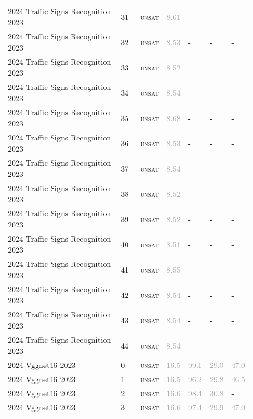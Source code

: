 \begin{center}
{\begin{longtable}{@{}lllllll@{}}
2024 Traffic Signs Recognition 2023 & 31 & ~\textsc{unsat} & \textcolor{darkgray}{8.61} & - & - & - \\
2024 Traffic Signs Recognition 2023 & 32 & ~\textsc{unsat} & \textcolor{darkgray}{8.53} & - & - & - \\
2024 Traffic Signs Recognition 2023 & 33 & ~\textsc{unsat} & \textcolor{darkgray}{8.52} & - & - & - \\
2024 Traffic Signs Recognition 2023 & 34 & ~\textsc{unsat} & \textcolor{darkgray}{8.54} & - & - & - \\
2024 Traffic Signs Recognition 2023 & 35 & ~\textsc{unsat} & \textcolor{darkgray}{8.68} & - & - & - \\
2024 Traffic Signs Recognition 2023 & 36 & ~\textsc{unsat} & \textcolor{darkgray}{8.53} & - & - & - \\
2024 Traffic Signs Recognition 2023 & 37 & ~\textsc{unsat} & \textcolor{darkgray}{8.54} & - & - & - \\
2024 Traffic Signs Recognition 2023 & 38 & ~\textsc{unsat} & \textcolor{darkgray}{8.52} & - & - & - \\
2024 Traffic Signs Recognition 2023 & 39 & ~\textsc{unsat} & \textcolor{darkgray}{8.52} & - & - & - \\
2024 Traffic Signs Recognition 2023 & 40 & ~\textsc{unsat} & \textcolor{darkgray}{8.51} & - & - & - \\
2024 Traffic Signs Recognition 2023 & 41 & ~\textsc{unsat} & \textcolor{darkgray}{8.55} & - & - & - \\
2024 Traffic Signs Recognition 2023 & 42 & ~\textsc{unsat} & \textcolor{darkgray}{8.54} & - & - & - \\
2024 Traffic Signs Recognition 2023 & 43 & ~\textsc{unsat} & \textcolor{darkgray}{8.54} & - & - & - \\
2024 Traffic Signs Recognition 2023 & 44 & ~\textsc{unsat} & \textcolor{darkgray}{8.54} & - & - & - \\
\midrule
2024 Vggnet16 2023 & 0 & ~\textsc{unsat} & \textcolor{darkgray}{16.5} & \textcolor{darkgray}{99.1} & \textcolor{darkgray}{29.0} & \textcolor{darkgray}{47.0} \\
2024 Vggnet16 2023 & 1 & ~\textsc{unsat} & \textcolor{darkgray}{16.5} & \textcolor{darkgray}{96.2} & \textcolor{darkgray}{29.8} & \textcolor{darkgray}{46.5} \\
2024 Vggnet16 2023 & 2 & ~\textsc{unsat} & \textcolor{darkgray}{16.6} & \textcolor{darkgray}{98.4} & \textcolor{darkgray}{30.8} & - \\
2024 Vggnet16 2023 & 3 & ~\textsc{unsat} & \textcolor{darkgray}{16.6} & \textcolor{darkgray}{97.4} & \textcolor{darkgray}{29.9} & \textcolor{darkgray}{47.0} \\

\end{longtable}}
\end{center}
